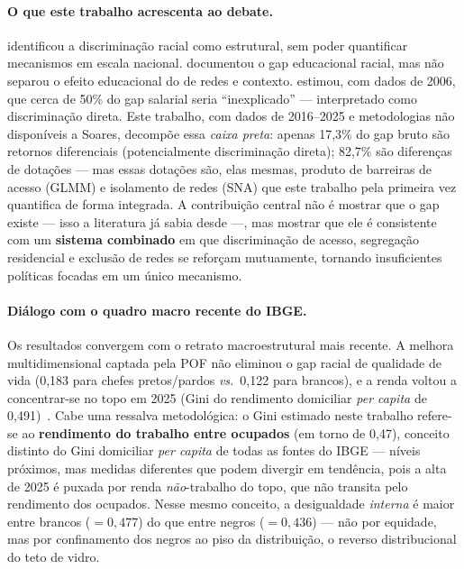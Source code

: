 \documentclass[12pt, a4paper, oneside]{article}
\begin{document}
\paragraph{O que este trabalho acrescenta ao debate.}
 identificou a discriminação racial como estrutural,
sem poder quantificar mecanismos em escala nacional.
 documentou o gap educacional racial, mas não separou
o efeito educacional do de redes e contexto.
 estimou, com dados de 2006, que cerca de 50\% do gap
salarial seria ``inexplicado'' --- interpretado como discriminação direta.
Este trabalho, com dados de 2016--2025 e metodologias não disponíveis
a Soares, decompõe essa \textit{caixa preta}: apenas 17,3\% do gap bruto
são retornos diferenciais (potencialmente discriminação direta); 82,7\%
são diferenças de dotações --- mas essas dotações são, elas mesmas,
produto de barreiras de acesso (GLMM) e isolamento de redes (SNA)
que este trabalho pela primeira vez quantifica de forma integrada.
A contribuição central não é mostrar que o gap existe --- isso a
literatura já sabia desde  ---,
mas mostrar que ele é consistente com um
\textbf{sistema combinado} em que discriminação de acesso, segregação
residencial e exclusão de redes se reforçam mutuamente, tornando
insuficientes políticas focadas em um único mecanismo.

\paragraph{Diálogo com o quadro macro recente do IBGE.}
Os resultados convergem com o retrato macroestrutural mais recente. A melhora
multidimensional captada pela POF não eliminou o gap racial de qualidade de vida
(0{,}183 para chefes pretos/pardos \emph{vs.}~0{,}122 para brancos), e a renda
voltou a concentrar-se no topo em 2025 (Gini do rendimento domiciliar
\emph{per capita} de 0{,}491)~\cite{ibge_pof_2019, ibge_rendimentos_2025}.
Cabe uma ressalva metodológica: o Gini estimado neste trabalho refere-se ao
\textbf{rendimento do trabalho entre ocupados} (em torno de 0{,}47), conceito
distinto do Gini domiciliar \emph{per capita} de todas as fontes do IBGE ---
níveis próximos, mas medidas diferentes que podem divergir em tendência, pois a
alta de 2025 é puxada por renda \emph{não}-trabalho do topo, que não transita
pelo rendimento dos ocupados. Nesse mesmo conceito, a desigualdade \emph{interna}
é maior entre brancos ($=0,477$) do que entre negros
($=0,436$) --- não por equidade, mas por confinamento dos
negros ao piso da distribuição, o reverso distribucional do teto de vidro.
\end{document}
